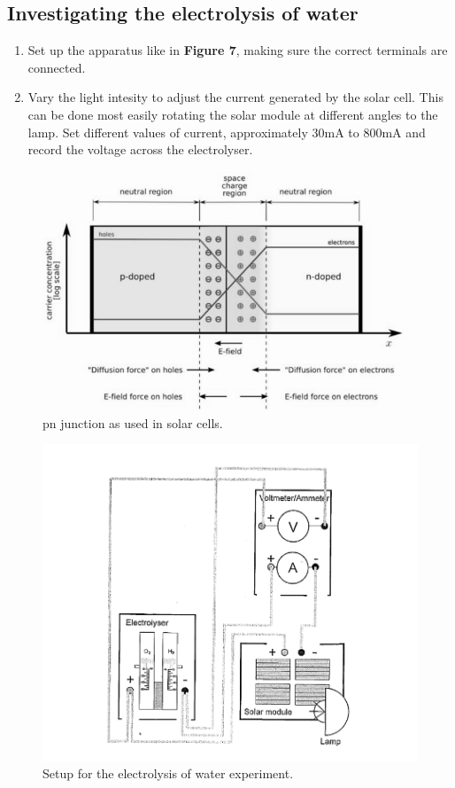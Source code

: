 \documentclass{article}
\begin{document}
    \subsection{Investigating the electrolysis of water}
    \begin{enumerate}
        \item Set up the apparatus like in \textbf{Figure 7}, making sure the correct terminals are connected.
        \item Vary the light intesity to adjust the current generated by the solar cell. This can be done most easily 
        rotating the solar module at different angles to the lamp. Set different values of current, approximately 30mA to 
        800mA and record the voltage across the electrolyser.
    \end{enumerate}
    \begin{figure}
        \centering
        \includegraphics[scale=0.4]{./pn.png}
        \caption{pn junction as used in solar cells. \cite{P:SE}}
    \end{figure}
    \begin{figure}
        \centering
        \includegraphics[scale=0.3]{./three.png}
        \caption{Setup for the electrolysis of water experiment. \cite{SCE}}
    \end{figure}
\end{document}
